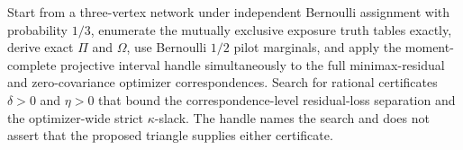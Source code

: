 Start from a three-vertex network under independent Bernoulli assignment with probability \(1/3\), enumerate the mutually exclusive exposure truth tables exactly, derive exact \(\Pi\) and \(\Omega\), use Bernoulli \(1/2\) pilot marginals, and apply the moment-complete projective interval handle simultaneously to the full minimax-residual and zero-covariance optimizer correspondences. Search for rational certificates \(\delta>0\) and \(\eta>0\) that bound the correspondence-level residual-loss separation and the optimizer-wide strict \(\kappa\)-slack. The handle names the search and does not assert that the proposed triangle supplies either certificate.